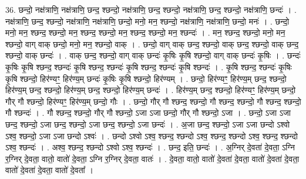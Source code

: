 \documentclass[17pt]{extarticle}
\begin{document}
36. छन्दो॒ नक्ष॑त्राणि॒ नक्ष॑त्राणि॒ छन्द॒ श्छन्दो॒ नक्ष॑त्राणि॒ छन्द॒ श्छन्दो॒ नक्ष॑त्राणि॒ छन्द॒ श्छन्दो॒ नक्ष॑त्राणि॒ छन्दः॑ । . नक्ष॑त्राणि॒ छन्द॒ श्छन्दो॒ नक्ष॑त्राणि॒ नक्ष॑त्राणि॒ छन्दो॒ मनो॒ मन॒ श्छन्दो॒ नक्ष॑त्राणि॒ नक्ष॑त्राणि॒ छन्दो॒ मनः॑ । . छन्दो॒ मनो॒ मन॒ श्छन्द॒ श्छन्दो॒ मन॒ श्छन्द॒ श्छन्दो॒ मन॒ श्छन्द॒ श्छन्दो॒ मन॒ श्छन्दः॑ । . मन॒ श्छन्द॒ श्छन्दो॒ मनो॒ मन॒ श्छन्दो॒ वाग् वाक् छन्दो॒ मनो॒ मन॒ श्छन्दो॒ वाक् । . छन्दो॒ वाग् वाक् छन्द॒ श्छन्दो॒ वाक् छन्द॒ श्छन्दो॒ वाक् छन्द॒ श्छन्दो॒ वाक् छन्दः॑ । . वाक् छन्द॒ श्छन्दो॒ वाग् वाक् छन्दः॑ कृ॒षिः कृ॒षि श्छन्दो॒ वाग् वाक् छन्दः॑ कृ॒षिः । . छन्दः॑ कृ॒षिः कृ॒षि श्छन्द॒ श्छन्दः॑ कृ॒षि श्छन्द॒ श्छन्दः॑ कृ॒षि श्छन्द॒ श्छन्दः॑ कृ॒षि श्छन्दः॑ । . कृ॒षि श्छन्द॒ श्छन्दः॑ कृ॒षिः कृ॒षि श्छन्दो॒ हिर॑ण्यꣳ॒॒ हिर॑ण्य॒म् छन्दः॑ कृ॒षिः कृ॒षि श्छन्दो॒ हिर॑ण्यम् । . छन्दो॒ हिर॑ण्यꣳ॒॒ हिर॑ण्य॒म् छन्द॒ श्छन्दो॒ हिर॑ण्य॒म् छन्द॒ श्छन्दो॒ हिर॑ण्य॒म् छन्द॒ श्छन्दो॒ हिर॑ण्य॒म् छन्दः॑ । . हिर॑ण्य॒म् छन्द॒ श्छन्दो॒ हिर॑ण्यꣳ॒॒ हिर॑ण्य॒म् छन्दो॒ गौर् गौ श्छन्दो॒ हिर॑ण्यꣳ॒॒ हिर॑ण्य॒म् छन्दो॒ गौः । . छन्दो॒ गौर् गौ श्छन्द॒ श्छन्दो॒ गौ श्छन्द॒ श्छन्दो॒ गौ श्छन्द॒ श्छन्दो॒ गौ श्छन्दः॑ । . गौ श्छन्द॒ श्छन्दो॒ गौर् गौ श्छन्दो॒ ऽजा ऽजा छन्दो॒ गौर् गौ श्छन्दो॒ ऽजा । . छन्दो॒ ऽजा ऽजा छन्द॒ श्छन्दो॒ ऽजा छन्द॒ श्छन्दो॒ ऽजा छन्द॒ श्छन्दो॒ ऽजा छन्दः॑ । . अ॒जा छन्द॒ श्छन्दो॒ ऽजा ऽजा छन्दो ऽश्वो ऽश्व॒ श्छन्दो॒ ऽजा ऽजा छन्दो ऽश्वः॑ । . छन्दो ऽश्वो ऽश्व॒ श्छन्द॒ श्छन्दो ऽश्व॒ श्छन्द॒ श्छन्दो ऽश्व॒ श्छन्द॒ श्छन्दो ऽश्व॒ श्छन्दः॑ । . अश्व॒ श्छन्द॒ श्छन्दो ऽश्वो ऽश्व॒ श्छन्दः॑ । . छन्द॒ इति॒ छन्दः॑ । . अ॒ग्निर् दे॒वता॑ दे॒वता॒ ऽग्नि र॒ग्निर् दे॒वता॒ वातो॒ वातो॑ दे॒वता॒ ऽग्नि र॒ग्निर् दे॒वता॒ वातः॑ । . दे॒वता॒ वातो॒ वातो॑ दे॒वता॑ दे॒वता॒ वातो॑ दे॒वता॑ दे॒वता॒ वातो॑ दे॒वता॑ दे॒वता॒ वातो॑ दे॒वता᳚ । \newline
\pagebreak
{}
\end{document}
